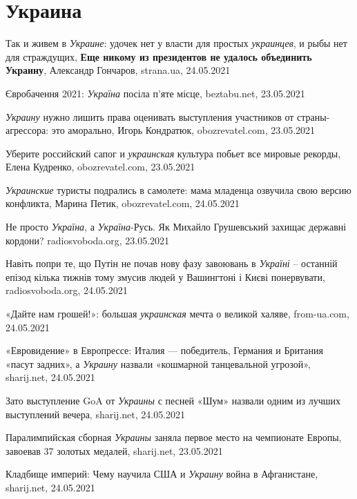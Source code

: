  
 
 
 
 
\chapter{Украина}
\label{sec:slova.ukraina}

Так и живем в \emph{Украине}: удочек нет у власти для простых \emph{украинцев},
и рыбы нет для страждущих, \textbf{Еще никому из президентов не удалось объединить
Украину}, Александр Гончаров, strana.ua, 24.05.2021

Євробачення 2021: \emph{Україна} посіла п'яте місце, beztabu.net, 23.05.2021

\emph{Украину} нужно лишить права оценивать выступления участников от
страны-агрессора: это аморально, Игорь Кондратюк, obozrevatel.com, 23.05.2021

Уберите российский сапог и \emph{украинская} культура побьет все мировые
рекорды, Елена Кудренко, obozrevatel.com, 23.05.2021

\emph{Украинские} туристы подрались в самолете: мама младенца озвучила свою
версию конфликта, Марина Петик, obozrevatel.com, 24.05.2021

Не просто \emph{Україна}, а \emph{Україна}-Русь. Як Михайло Грушевський захищає
державні кордони?  radiosvoboda.org, 23.05.2021

Навіть попри те, що Путін не почав нову фазу завоювань в \emph{Україні} –
останній епізод кілька тижнів тому змусив людей у Вашингтоні і Києві
понервувати,
radiosvoboda.org, 24.05.2021

«Дайте нам грошей!»: большая \emph{украинская} мечта о великой халяве, from-ua.com, 24.05.2021

«Евровидение» в Европрессе: Италия — победитель, Германия и Британия  «пасут
задних», а \emph{Украину} назвали «кошмарной танцевальной угрозой», sharij.net,
24.05.2021

Зато выступление GoA от \emph{Украины} с песней «Шум» назвали одним из лучших
выступлений вечера,
sharij.net, 24.05.2021

Паралимпийская сборная \emph{Украины} заняла первое место на чемпионате Европы,
завоевав 37 золотых медалей, sharij.net, 23.05.2021

Кладбище империй: Чему научила США и \emph{Украину} война в Афганистане,
sharij.net, 24.05.2021

